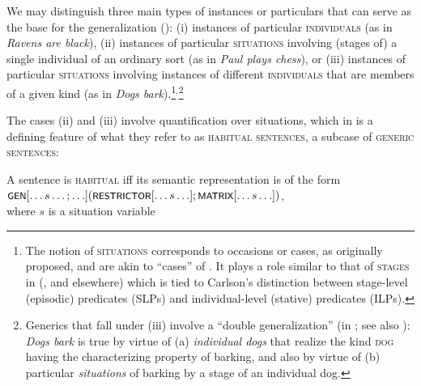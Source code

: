 \documentclass[output=paper,colorlinks,citecolor=brown]{langscibook}
\begin{document}
We may distinguish three main types of instances or particulars 
that can serve as the base for the generalization (\citealt{carlson2011}): (i) instances of particular \textsc{individuals} (as in \textit{Ravens are black}), 
(ii) instances of particular \textsc{situations} involving 
(stages of) a single individual of an ordinary sort (as in \textit{Paul plays chess}), or (iii) instances of particular \textsc{situations} involving instances of different \textsc{individuals}
that are members of a given kind (as in \textit{Dogs bark}).\footnote{The notion of 
\textsc{situations} corresponds to occasions or cases, as \citet{lawler1972} originally proposed, and are akin to ``cases'' of \citet{lewis1975} \citep[30]{krifka1995genericity}.
It plays a role similar to that of \textsc{stages} in \citeauthor{carlson1977unified} (\citeyear{carlson1977unified}, and elsewhere) which is tied to Carlson’s distinction between stage-level (episodic) predicates (SLPs) and individual-level (stative) predicates (ILPs).}$^,$\footnote{\label{fn:double}Generics that fall under (iii)  involve a ``double generalization'' (in \citealt{carlson2011}; see also \citealt[1131]{pelletier1997generics}): 
\textit{Dogs bark} is true by virtue of (a) \textit{individual dogs} that realize the kind \textsc{dog}  having the characterizing property of barking, and also by virtue of (b) particular \textit{situations} of barking by a stage of an individual dog.} 

The cases (ii) and (iii) involve quantification over situations, which in \citet{krifka1995genericity}
is a defining feature of what they refer to as \textsc{habitual sentences}, a subcase of \textsc{generic sentences}:

\ea \label{habitual.def} A sentence is \textsc{habitual} iff its semantic representation is of the form\\
$\cnst{Gen}[ \ldots  s \ldots ; \ldots ] (\cnst{Restrictor} [ \ldots s \ldots ]; \cnst{Matrix} [ \ldots  s  \ldots ])$, \\
where $s$ is a situation variable\hfill\citep[32, ex.~(56)]{krifka1995genericity} 
\z
\end{document}
